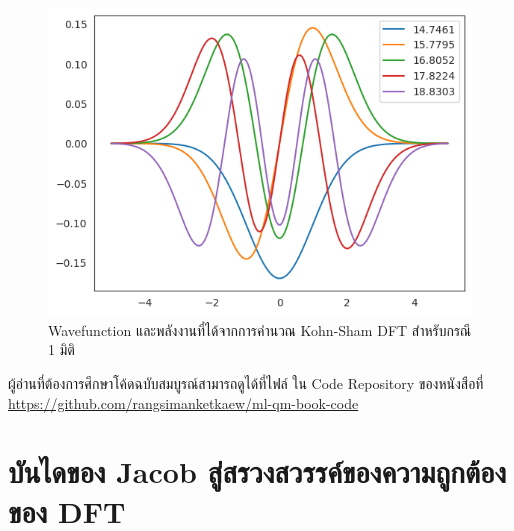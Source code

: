 \begin{figure}[H]
    \centering
    \includegraphics[width=0.9\linewidth]{fig/ks_dft_1d_wfn_ener.png}
    \caption{Wavefunction และพลังงานที่ได้จากการคำนวณ Kohn-Sham DFT สำหรับกรณี 1 มิติ}
    \label{fig:ks_dft_1d_wfn_ener}
\end{figure}

ผู้อ่านที่ต้องการศึกษาโค้ดฉบับสมบูรณ์สามารถดูได้ที่ไฟล์  ใน Code Repository ของหนังสือที่
\url{https://github.com/rangsimanketkaew/ml-qm-book-code}

\section{บันไดของ Jacob สู่สรวงสวรรค์ของความถูกต้องของ DFT}
\label{sec:jacob_ladder}

